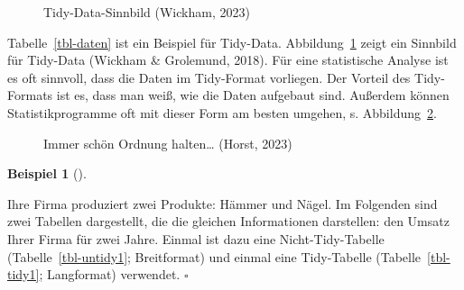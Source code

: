 \documentclass[
  letterpaper,
  twoside,
  open=any]{scrbook}
\theoremstyle{definition}
\theoremstyle{definition}
\theoremstyle{definition}
\newtheorem{example}{Beispiel}[chapter]
\theoremstyle{remark}
\begin{document}
\begin{figure}


\caption{\label{fig-tidy1}Tidy-Data-Sinnbild (Wickham, 2023)}

\end{figure}%

Tabelle~\ref{tbl-daten} ist ein Beispiel für Tidy-Data.
Abbildung~\ref{fig-tidy1} zeigt ein Sinnbild für Tidy-Data (Wickham \&
Grolemund, 2018). Für eine statistische Analyse ist es oft sinnvoll,
dass die Daten im Tidy-Format vorliegen. Der Vorteil des Tidy-Formats
ist es, dass man weiß, wie die Daten aufgebaut sind. Außerdem können
Statistikprogramme oft mit dieser Form am besten umgehen, s.
Abbildung~\ref{fig-tidy3}.

\begin{figure}


\caption{\label{fig-tidy3}Immer schön Ordnung halten\ldots{} (Horst,
2023)}

\end{figure}%

\begin{example}[]\protect\hypertarget{exm-widelong}{}\label{exm-widelong}

Ihre Firma produziert zwei Produkte: Hämmer und Nägel. Im Folgenden sind
zwei Tabellen dargestellt, die die gleichen Informationen darstellen:
den Umsatz Ihrer Firma für zwei Jahre. Einmal ist dazu eine
Nicht-Tidy-Tabelle (Tabelle~\ref{tbl-untidy1}; Breitformat) und einmal
eine Tidy-Tabelle (Tabelle~\ref{tbl-tidy1}; Langformat) verwendet.
\(\square\)

\end{example}
\end{document}
